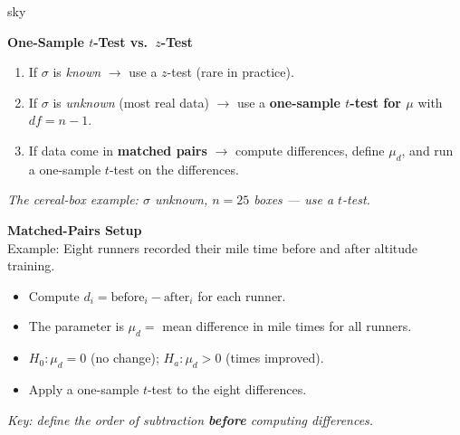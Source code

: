 \documentclass[10pt]{article}
\begin{document}
\begin{skillbox}{sky}
\begin{minipage}[t]{0.48\linewidth}
    \textbf{One-Sample $t$-Test vs.\ $z$-Test}
    \begin{enumerate}
        \item If $\sigma$ is \emph{known} $\to$ use a $z$-test (rare in practice).
        \item If $\sigma$ is \emph{unknown} (most real data) $\to$ use a \textbf{one-sample
              $t$-test for $\mu$} with $df = n - 1$.
        \item If data come in \textbf{matched pairs} $\to$ compute differences, define
              $\mu_d$, and run a one-sample $t$-test on the differences.
    \end{enumerate}
    \textit{The cereal-box example: $\sigma$ unknown, $n = 25$ boxes --- use a $t$-test.}
\end{minipage}
\hfill
\begin{minipage}[t]{0.48\linewidth}
    \textbf{Matched-Pairs Setup}\\
    Example: Eight runners recorded their mile time before and after altitude training.
    \begin{itemize}
        \item Compute $d_i = \text{before}_i - \text{after}_i$ for each runner.
        \item The parameter is $\mu_d =$ mean difference in mile times for all runners.
        \item $H_0: \mu_d = 0$ (no change); $H_a: \mu_d > 0$ (times improved).
        \item Apply a one-sample $t$-test to the eight differences.
    \end{itemize}
    \textit{Key: define the order of subtraction \textbf{before} computing differences.}
\end{minipage}
\end{skillbox}
\end{document}
